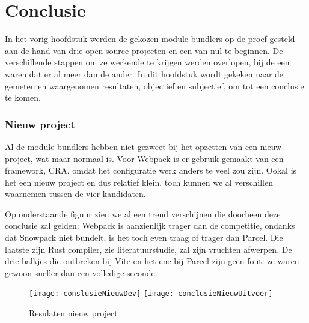 
\chapter{Conclusie}
\label{ch:conclusie}


In het vorig hoofdstuk werden de gekozen module bundlers op de proef gesteld aan de hand van drie open-source projecten en een van nul te beginnen. De verschillende stappen om ze werkende te krijgen werden overlopen, bij de een waren dat er al meer dan de ander. In dit hoofdstuk wordt gekeken naar de gemeten en waargenomen resultaten, objectief en subjectief, om tot een conclusie te komen.

\subsection{Nieuw project}

Al de module bundlers hebben niet gezweet bij het opzetten van een nieuw project, wat maar normaal is. Voor Webpack is er gebruik gemaakt van een framework, CRA, omdat het configuratie werk anders te veel zou zijn. Ookal is het een nieuw project en dus relatief klein, toch kunnen we al verschillen waarnemen tussen de vier kandidaten. 

Op onderstaande figuur zien we al een trend verschijnen die doorheen deze conclusie zal gelden: Webpack is aanzienlijk trager dan de competitie, ondanks dat Snowpack niet bundelt, is het toch even traag of trager dan Parcel. Die laatste zijn Rust compiler, zie literatuurstudie, zal zijn vruchten afwerpen. De drie balkjes die ontbreken bij Vite en het ene bij Parcel zijn geen fout: ze waren gewoon sneller dan een volledige seconde. 

\begin{figure}[h]
    \texttt{[image: conslusieNieuwDev]}
        \centering
        \texttt{[image: conclusieNieuwUitvoer]}
        \centering
        \caption[]{Resulaten nieuw project}
    \end{figure}


